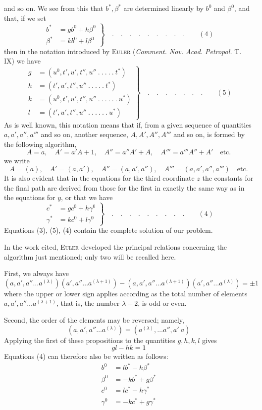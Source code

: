 and so on. We see from this that $b^*,\beta^*$ are determined linearly by $b^0$ and $\beta^0$, and that, if we set
\[
\left.\begin{aligned}
b^*&=gb^0+h\beta^0\\
\beta^*&=kb^0+l\beta^0
\end{aligned}\right\}\quad .\quad .\quad .\quad .\quad .\quad .\quad .\quad .\quad .\qquad (4)
\]
then in the notation introduced by \textsc{Euler} (\textit{Comment. Nov. Acad. Petropol.} T. IX) we have
\[
\left.\begin{aligned}
g&=(u^0,t',u',t'',u''\ .\ .\ .\ .\ .\ t^*)\\
h&=(t',u',t'',u''\ .\ .\ .\ .\ .\ t^*)\\
k&=(u^0,t',u',t'',u''\ .\ .\ .\ .\ .\ .\ u^*)\\
l&=(t',u',t'',u''\ .\ .\ .\ .\ .\ .\ u^*)
\end{aligned}\right\}\quad .\quad .\quad .\quad .\quad .\quad .\quad .\qquad (5)
\]
As is well known, this notation means that if, from a given sequence of quantities $a,a',a'',a'''$ and so on, another sequence, $A,A',A'',A'''$ and so on, is formed by the following algorithm,
\[
A=a,\quad A'=a'A+1,\quad A''=a''A'+A,\quad A'''=a'''A''+A'\quad\text{etc.}
\]
we write
\[
A=(a),\quad A'=(a,a'),\quad A''=(a,a',a''),\quad A'''=(a,a',a'',a''')\quad\text{etc.}
\]
It is also evident that in the equations for the third coordinate $z$ the constants for the final path are derived from those for the first in exactly the same way as in the equations for $y$, or that we have
\[
\left.\begin{aligned}
c^*&=gc^0+h\gamma^0\\
\gamma^*&=kc^0+l\gamma^0
\end{aligned}\right\}\quad .\quad .\quad .\quad .\quad .\quad .\quad .\quad .\quad .\qquad (4)
\]
Equations (3), (5), (4) contain the complete solution of our problem.

In the work cited, \textsc{Euler} developed the principal relations concerning the algorithm just mentioned; only two will be recalled here.

First, we always have
\[
(a,a',a''\ldots a^{(\lambda)})(a',a''\ldots a^{(\lambda+1)})-(a,a',a''\ldots a^{(\lambda+1)})(a',a''\ldots a^{(\lambda)})=\pm1
\]
where the upper or lower sign applies according as the total number of elements $a,a',a''\ldots a^{(\lambda+1)}$, that is, the number $\lambda+2$, is odd or even.

Second, the order of the elements may be reversed; namely,
\[
(a,a',a''\ldots a^{(\lambda)})=(a^{(\lambda)},\ldots a'',a'\ a)
\]
Applying the first of these propositions to the quantities $g,h,k,l$ gives
\[
gl-hk=1
\]
Equations (4) can therefore also be written as follows:
\[
\begin{aligned}
b^0&=lb^*-h\beta^*\\
\beta^0&=-kb^*+g\beta^*\\
c^0&=lc^*-h\gamma^*\\
\gamma^0&=-kc^*+g\gamma^*
\end{aligned}
\]

